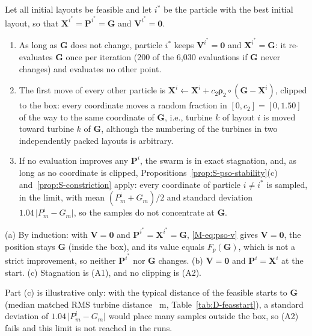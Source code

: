 \begin{thS}
\label{prop:S-frozen}
Let all initial layouts be feasible and let $i^*$ be the particle with the best initial layout, so that $\mathbf X^{i^*}=\mathbf P^{i^*}=\mathbf G$ and $\mathbf V^{i^*}=\mathbf 0$.
\begin{enumerate}
\item[(a)] As long as $\mathbf G$ does not change, particle $i^*$ keeps $\mathbf V^{i^*}=\mathbf 0$ and $\mathbf X^{i^*}=\mathbf G$: it re-evaluates $\mathbf G$ once per iteration (200 of the 6{,}030 evaluations if $\mathbf G$ never changes) and evaluates no other point.
\item[(b)] The first move of every other particle is $\mathbf X^i\leftarrow\mathbf X^i+c_2\boldsymbol\rho_2\circ(\mathbf G-\mathbf X^i)$, clipped to the box: every coordinate moves a random fraction in $[0,c_2]=[0,1.50]$ of the way to the same coordinate of $\mathbf G$, i.e., turbine $k$ of layout $i$ is moved toward turbine $k$ of $\mathbf G$, although the numbering of the turbines in two independently packed layouts is arbitrary.
\item[(c)] If no evaluation improves any $\mathbf P^i$, the swarm is in exact stagnation, and, as long as no coordinate is clipped, Propositions~\ref{prop:S-pso-stability}(c) and~\ref{prop:S-constriction} apply: every coordinate of particle $i\ne i^*$ is sampled, in the limit, with mean $(P^i_m+G_m)/2$ and standard deviation $1.04\,\lvert P^i_m-G_m\rvert$, so the samples do not concentrate at $\mathbf G$.
\end{enumerate}
\end{thS}
\begin{thSproof}
(a) By induction: with $\mathbf V=\mathbf 0$ and $\mathbf P^{i^*}=\mathbf X^{i^*}=\mathbf G$, \eqref{M-eq:pso-v} gives $\mathbf V=\mathbf0$, the position stays $\mathbf G$ (inside the box), and its value equals $F_p(\mathbf G)$, which is not a strict improvement, so neither $\mathbf P^{i^*}$ nor $\mathbf G$ changes. (b) $\mathbf V=\mathbf 0$ and $\mathbf P^i=\mathbf X^i$ at the start. (c) Stagnation is (A1), and no clipping is (A2).
\end{thSproof}
Part (c) is illustrative only: with the typical distance of the feasible starts to $\mathbf G$ (median matched RMS turbine distance \NDFsInitRms~m, Table~\ref{tab:D-feasstart}), a standard deviation of $1.04\,\lvert P^i_m-G_m\rvert$ would place many samples outside the box, so (A2) fails and this limit is not reached in the runs.


